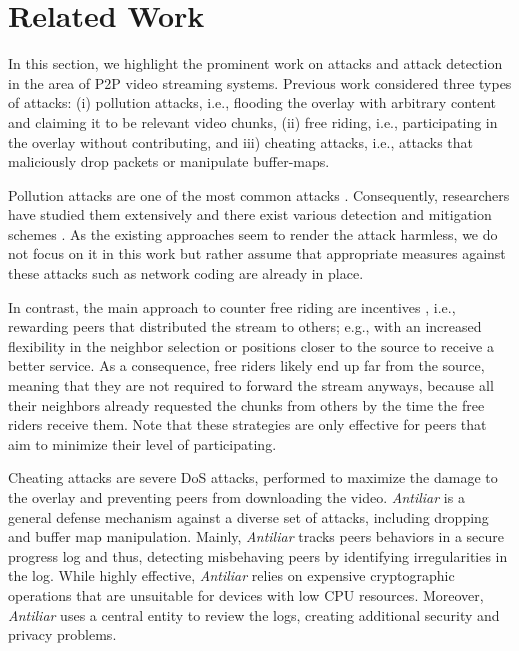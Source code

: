 \section{Related Work}
\label{sec:related}

In this section, we highlight the prominent work on attacks and attack detection in the area of P2P video streaming systems.
Previous work considered three types of attacks: (i) pollution attacks, i.e., flooding the overlay with arbitrary content and claiming it to be relevant video chunks, (ii) free riding, i.e., participating in the overlay without contributing, and iii) cheating attacks, i.e., attacks that maliciously drop packets or manipulate buffer-maps. 

Pollution attacks are one of the most common attacks \cite{pollution1}.
Consequently, researchers have studied them extensively and there exist various detection and mitigation schemes \cite{pollution2}.    
As the existing approaches seem to render the attack harmless, we do not focus on it in this work but rather assume that appropriate measures against these attacks such as network coding \cite{nc} are already in place.

In contrast, the main approach to counter free riding are incentives \cite{defending,defending2}, i.e., rewarding peers that distributed the stream to others; e.g., with an increased flexibility in the neighbor selection or positions closer to the source to receive a better service. 
As a consequence, free riders likely end up far from the source, meaning that they are not required to forward the stream anyways, because all their neighbors already requested the chunks from others by the time the free riders receive them. 
Note that these strategies are only effective for peers that aim to minimize their level of participating. 

Cheating attacks are severe DoS attacks, performed to maximize the damage to the overlay and preventing peers from downloading the video.   
\textit{Antiliar} is a general defense mechanism against a diverse set of attacks, including dropping and buffer map manipulation\cite{antiliar}.
Mainly, \textit{Antiliar} tracks peers behaviors in a secure progress log and thus, detecting misbehaving peers by identifying irregularities in the log. 
While highly effective, \textit{Antiliar} relies on expensive cryptographic operations that are unsuitable for devices with low CPU resources.
Moreover, \textit{Antiliar} uses a central entity to review the logs, creating additional security and privacy problems. 

